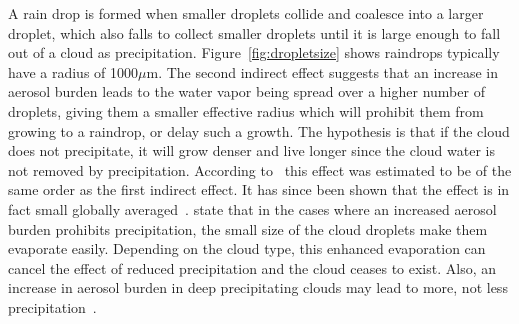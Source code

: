 A rain drop is formed when smaller droplets collide and coalesce into a larger droplet, which also falls to collect smaller droplets until it is large enough to fall out of a cloud as precipitation. Figure~\ref{fig:dropletsize} shows raindrops typically have a radius of 1000$\mu\text{m}$. The second indirect effect suggests that an increase in aerosol burden leads to the water vapor being spread over a higher number of droplets, giving them a smaller effective radius which will prohibit them from growing to a raindrop, or delay such a growth. The hypothesis is that if the cloud does not precipitate, it will grow denser and live longer since the cloud water is not removed by precipitation. According to~\citet{Lohmann2005} this effect was estimated to be of the same order as the first indirect effect. It has since been shown that the effect is in fact small globally averaged~\citep{Stevens2009}. \citet{Stevens2009} state that in the cases where an increased aerosol burden prohibits precipitation, the small size of the cloud droplets make them evaporate easily. Depending on the cloud type, this enhanced evaporation can cancel the effect of reduced precipitation and the cloud ceases to exist. Also, an increase in aerosol burden in deep precipitating clouds may lead to more, not less precipitation~\citep{Stevens2008}.


